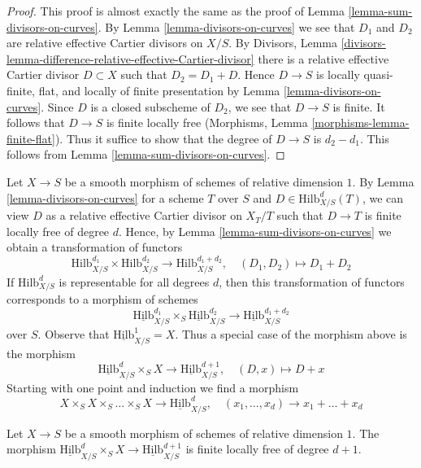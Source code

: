 \begin{proof}
This proof is almost exactly the same as the proof of
Lemma \ref{lemma-sum-divisors-on-curves}.
By Lemma \ref{lemma-divisors-on-curves} we see that $D_1$
and $D_2$ are relative effective Cartier divisors on $X/S$.
By Divisors, Lemma
\ref{divisors-lemma-difference-relative-effective-Cartier-divisor}
there is a relative effective Cartier divisor $D \subset X$
such that $D_2 = D_1 + D$. Hence $D \to S$ is locally quasi-finite, flat, and
locally of finite presentation by
Lemma \ref{lemma-divisors-on-curves}.
Since $D$ is a closed subscheme of $D_2$, we see that
$D \to S$ is finite. It follows that $D \to S$ is finite locally free
(Morphisms, Lemma \ref{morphisms-lemma-finite-flat}).
Thus it suffice to show that the degree of $D \to S$ is $d_2 - d_1$.
This follows from Lemma \ref{lemma-sum-divisors-on-curves}.
\end{proof}

\noindent
Let $X \to S$ be a smooth morphism of schemes of relative dimension $1$.
By Lemma \ref{lemma-divisors-on-curves} for a scheme $T$ over $S$ and
$D \in \text{Hilb}^d_{X/S}(T)$, we can view $D$ as a relative
effective Cartier divisor on $X_T/T$ such that $D \to T$ is finite
locally free of degree $d$. Hence, by
Lemma \ref{lemma-sum-divisors-on-curves} we obtain a transformation
of functors
$$
\text{Hilb}^{d_1}_{X/S} \times \text{Hilb}^{d_2}_{X/S}
\longrightarrow
\text{Hilb}^{d_1 + d_2}_{X/S},\quad
(D_1, D_2) \longmapsto D_1 + D_2
$$
If $\text{Hilb}^d_{X/S}$ is representable for all degrees $d$, then
this transformation of functors corresponds to a morphism of schemes
$$
\underline{\text{Hilb}}^{d_1}_{X/S}
\times_S
\underline{\text{Hilb}}^{d_2}_{X/S}
\longrightarrow
\underline{\text{Hilb}}^{d_1 + d_2}_{X/S}
$$
over $S$.
Observe that $\underline{\text{Hilb}}^1_{X/S} = X$.
Thus a special case of the morphism above is the morphism
$$
\underline{\text{Hilb}}^d_{X/S} \times_S X
\longrightarrow
\underline{\text{Hilb}}^{d + 1}_{X/S},\quad
(D, x) \longmapsto D + x
$$
Starting with one point and induction we find a morphism
$$
X \times_S X \times_S \ldots \times_S X
\longrightarrow
\underline{\text{Hilb}}^d_{X/S},\quad
(x_1, \ldots, x_d) \longrightarrow x_1 + \ldots + x_d
$$

\begin{lemma}
\label{lemma-universal-object}
Let $X \to S$ be a smooth morphism of schemes of relative dimension $1$.
The morphism
$\underline{\text{Hilb}}^d_{X/S} \times_S X \to
\underline{\text{Hilb}}^{d + 1}_{X/S}$
is finite locally free of degree $d + 1$.
\end{lemma}

